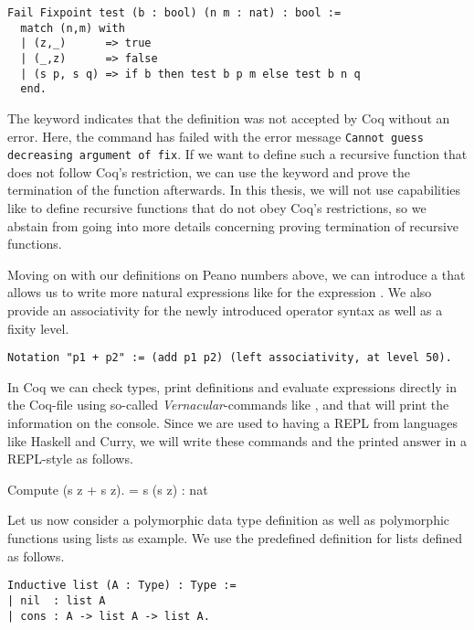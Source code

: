\begin{verbatim}
Fail Fixpoint test (b : bool) (n m : nat) : bool :=
  match (n,m) with
  | (z,_)      => true
  | (_,z)      => false
  | (s p, s q) => if b then test b p m else test b n q
  end.
\end{verbatim}

The keyword  indicates that the definition was not accepted by Coq without an error.
Here, the command has failed with the error message \texttt{Cannot guess decreasing argument of fix}.
If we want to define such a recursive function that does not follow Coq's restriction, we can use the keyword  and prove the termination of the function afterwards.
In this thesis, we will not use capabilities like  to define recursive functions that do not obey Coq's restrictions, so we abstain from going into more details concerning proving termination of recursive functions.

Moving on with our definitions on Peano numbers above, we can introduce a  that allows us to write more natural expressions like  for the expression .
We also provide an associativity for the newly introduced operator syntax as well as a fixity level.

\begin{verbatim}
Notation "p1 + p2" := (add p1 p2) (left associativity, at level 50).
\end{verbatim}

In Coq we can check types, print definitions and evaluate expressions directly in the Coq-file using so-called \emph{Vernacular}-commands like ,  and  that will print the information on the console.
Since we are used to having a REPL from languages like Haskell and Curry, we will write these commands and the printed answer in a REPL-style as follows.

\begin{crepl}
\coqrepl Compute (s z + s z).
   = s (s z)
   : nat
\end{crepl}

Let us now consider a polymorphic data type definition as well as polymorphic functions using lists as example.
We use the predefined definition for lists defined as follows.

\begin{verbatim}
Inductive list (A : Type) : Type :=
| nil  : list A
| cons : A -> list A -> list A.
\end{verbatim}

